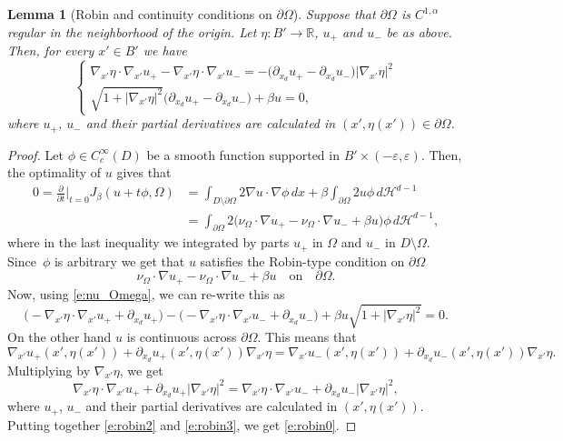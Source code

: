 \documentclass[JEP,XML,SOM,Unicode]{cedram}
\theoremstyle{plain}
\newtheorem{lemma}[teo]{Lemma}
\theoremstyle{definition}
\let\eps\varepsilon
\def\R{\mathbb{R}}
\def\HH{\mathcal{H}}
\begin{document}
\begin{lemma}[Robin and continuity conditions on $\partial\Omega$]\label{l:robin_condition}
Suppose that $\partial\Omega$ is $C^{1,\alpha}$ regular in the neighborhood of the origin. Let $\eta:B'\to\R$, $u_+$ and $u_-$ be as above. Then, for every $x'\in B'$ we have
\begin{equation}\label{e:robin0}
\begin{cases}
\nabla_{\!x'}\eta\cdot \nabla_{\!x'}u_+-\nabla_{\!x'}\eta\cdot \nabla_{\!x'}u_-=-\big(\partial_{x_d}u_+-\partial_{x_d}u_-\big)|\nabla_{\!x'}\eta|^2\\
\sqrt{1+|\nabla_{\!x'}\eta|^2}\big(\partial_{x_d}u_+-\partial_{x_d}u_-\big)+\beta u=0,
\end{cases}
\end{equation}
where $u_+$, $u_-$ and their partial derivatives are calculated in $(x',\eta(x'))\in \partial\Omega$.
\end{lemma}
\begin{proof}
Let $\phi\in C^{\infty}_c(D)$ be a smooth function supported in $B'\times(-\eps,\eps)$.
Then, the optimality of $u$ gives that
\begin{align*}
0=\frac{\partial}{\partial t}\Big\vert_{t=0}J_\beta(u+t\phi,\Omega)&=\int_{D\setminus\partial\Omega}2\nabla u\cdot\nabla \phi\,dx+\beta\int_{\partial\Omega}2u\phi\,d\HH^{d-1}\\
&=\int_{\partial\Omega}2\big(\nu_\Omega\cdot\nabla u_+-\nu_\Omega\cdot\nabla u_-+\beta u\big)\phi\,d\HH^{d-1},
\end{align*}
where in the last inequality we integrated by parts $u_+$ in $\Omega$ and $u_-$ in $D\setminus\Omega$.
Since~$\phi$ is arbitrary we get that $u$ satisfies the Robin-type condition on $\partial\Omega$
\begin{equation}%
\nu_\Omega\cdot\nabla u_+-\nu_\Omega\cdot\nabla u_-+\beta u\quad\text{on}\quad \partial\Omega.
\end{equation}
Now, using \eqref{e:nu_Omega}, we can re-write this as
\begin{equation}\label{e:robin2}
\big(-\nabla_{\!x'}\eta\cdot\nabla_{\!x'}u_++\partial_{x_d}u_+\big)-\big(-\nabla_{\!x'}\eta\cdot\nabla_{\!x'}u_-+\partial_{x_d}u_-\big)+\beta u \sqrt{1+|\nabla_{\!x'}\eta|^2}=0.
\end{equation}
On the other hand $u$ is continuous across $\partial\Omega$. This means that
\[\nabla_{\!x'}u_+(x',\eta(x'))+\partial_{x_d}u_+(x',\eta(x'))\nabla_{\!x'}\eta=\nabla_{\!x'}u_-(x',\eta(x'))+\partial_{x_d}u_-(x',\eta(x'))\nabla_{\!x'}\eta.\]
Multiplying by $\nabla_{\!x'}\eta$, we get
\begin{equation}\label{e:robin3}
\nabla_{\!x'}\eta\cdot \nabla_{\!x'}u_++\partial_{x_d}u_+|\nabla_{\!x'}\eta|^2=\nabla_{\!x'}\eta\cdot \nabla_{\!x'}u_-+\partial_{x_d}u_-|\nabla_{\!x'}\eta|^2,
\end{equation}
where $u_+$, $u_-$ and their partial derivatives are calculated in $(x',\eta(x'))$. Putting together \eqref{e:robin2} and \eqref{e:robin3}, we get \eqref{e:robin0}.
\end{proof}
\end{document}
